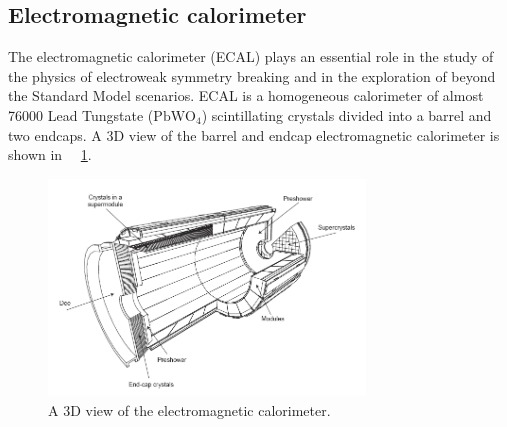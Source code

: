
\subsection{Electromagnetic calorimeter}
The electromagnetic calorimeter (ECAL) plays an essential role in the study of the physics of electroweak symmetry breaking and  in the exploration of  beyond the Standard Model scenarios.  ECAL is a homogeneous calorimeter of almost 76000 Lead Tungstate ($\mathrm{PbWO_4}$) scintillating crystals divided into a barrel and two endcaps.
A $3$D view of the barrel and endcap electromagnetic calorimeter is shown in \figurename~~\ref{ECAL_3D}.
\begin{figure}[h!]
 \centering
 \includegraphics[width=0.75\textwidth]{Images/ECAL_3D}
 \caption{A $3$D view of the electromagnetic calorimeter.}
\label{ECAL_3D}
\end{figure}


